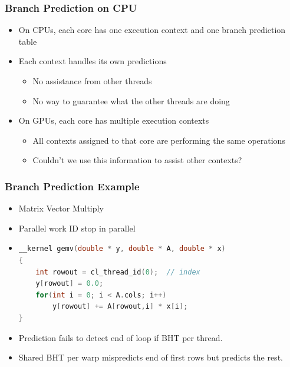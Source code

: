 \documentclass{beamer}
\begin{document}
\begin{frame}
	\frametitle{Branch Prediction on CPU}
	\begin{itemize}
		\item On CPUs, each core has one execution context and one branch prediction table
		\item Each context handles its own predictions
		\begin{itemize}
			\item No assistance from other threads 
			\item No way to guarantee what the other threads are doing
		\end{itemize}
		\item On GPUs, each core has multiple execution contexts
		\begin{itemize}
			\item All contexts assigned to that core are performing the same operations
			\item Couldn't we use this information to assist other contexts?
		\end{itemize}
	\end{itemize}
\end{frame}

\begin{frame}[fragile]
	\frametitle{Branch Prediction Example}
	\begin{itemize}
		\item Matrix Vector Multiply
		\item Parallel work ID stop in parallel
		\item
	\begin{lstlisting}[language=C,basicstyle=\footnotesize,frame=single,tabsize=4,title=GemV.cl]
__kernel gemv(double * y, double * A, double * x)
{
    int rowout = cl_thread_id(0);  // index
    y[rowout] = 0.0;
    for(int i = 0; i < A.cols; i++)
        y[rowout] += A[rowout,i] * x[i];
}
	\end{lstlisting}
		\item Prediction fails to detect end of loop if BHT per thread.
		\item Shared BHT per warp mispredicts end of first rows but predicts the rest.
	\end{itemize}
\end{frame}
\end{document}
